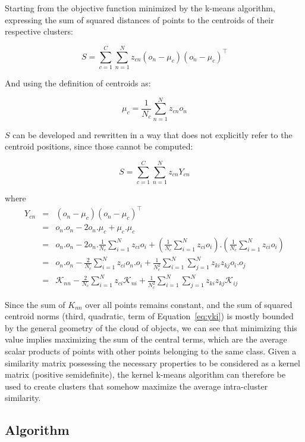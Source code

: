 \documentclass[a4paper,twoside]{article}
\begin{document}
Starting from the objective function minimized by the k-means algorithm, expressing the sum of squared distances of points to the centroids of their respective clusters:

\[
S = \sum_{c=1}^{C} \sum_{n=1}^{N} z_{cn} \left(o_n-\mu_c\right)\left(o_n-\mu_c\right)^\top \label{eq:S}
\]

And using the definition of centroids as:

\[
\mu_c = \frac{1}{N_c}\sum_{n=1}^{N}z_{cn}o_n
\]

$S$ can be developed and rewritten in a way that does not explicitly refer to the centroid positions, since those cannot be computed:

\[
S = \sum_{c=1}^{C} \sum_{n=1}^{N} z_{cn} Y_{cn}
\]

where
\begin{eqnarray}
Y_{cn} & = & \left(o_n-\mu_c\right)\left(o_n-\mu_c\right)^\top \\
       & = & o_n.o_n - 2 o_n.\mu_c + \mu_c.\mu_c \\
       & = & o_n.o_n - 2 o_n.\frac{1}{N_c} \sum_{i=1}^{N} z_{ci} o_i +
       	 \left(\frac{1}{N_c} \sum_{i=1}^{N} z_{ci} o_i\right).\left(\frac{1}{N_c} \sum_{i=1}^{N} z_{ci} o_i\right) \\
       & = & o_n.o_n - \frac{2}{N_c} \sum_{i=1}^{N} z_{ci} o_n.o_i +
       	 \frac{1}{N_c^2} \sum_{i=1}^{N} \sum_{j=1}^{N} z_{ki} z_{kj} o_i.o_j \\
       & = & \mathcal{K}_{nn} - \frac{2}{N_c} \sum_{i=1}^{N} z_{ci} \mathcal{K}_{ni} +
         \frac{1}{N_c^2} \sum_{i=1}^{N} \sum_{j=1}^{N} z_{ki} z_{kj} \mathcal{K}_{ij} \label{eq:yki}
\end{eqnarray}

Since the sum of $K_{nn}$ over all points remains constant, and the sum of squared centroid norms (third, quadratic, term of Equation~\ref{eq:yki}) is mostly bounded by the general geometry of the cloud of objects, we can see that minimizing this value implies maximizing the sum of the central terms, which are the average scalar products of points with other points belonging to the same class. Given a similarity matrix possessing the necessary properties to be considered as a kernel matrix (positive semidefinite), the kernel k-means algorithm can therefore be used to create clusters that somehow maximize the average intra-cluster similarity.

\subsection{Algorithm}
\end{document}
